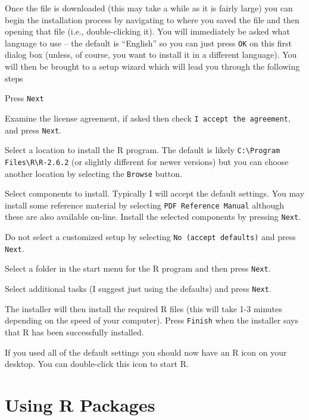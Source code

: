 \documentclass[a4paper]{article}
\begin{document}
Once the file is downloaded (this may take a while as it is fairly large) you can begin the installation process by navigating to where you saved the file and then opening that file (i.e., double-clicking it).  You will immediately be asked what language to use -- the default is ``English'' so you can just press \verb"OK" on this first dialog box (unless, of course, you want to install it in a different language).  You will then be brought to a setup wizard which will lead you through the following steps
\begin{Enumerate}
  \item Press \verb"Next"
  \item Examine the license agreement, if asked then check \verb"I accept the agreement", and press \verb"Next".
  \item Select a location to install the R program.  The default is likely \verb"C:\Program Files\R\R-2.6.2" (or slightly different for newer versions) but you can choose another location by selecting the \verb"Browse" button.
  \item Select components to install.  Typically I will accept the default settings.  You may install some reference material by selecting \verb"PDF Reference Manual" although these are also available on-line.  Install the selected components by pressing \verb"Next".
  \item Do not select a customized setup by selecting \verb"No (accept defaults)" and press \verb"Next".
  \item Select a folder in the start menu for the R program and then press \verb"Next".
  \item Select additional tasks (I suggest just using the defaults) and press \verb"Next".
  \item The installer will then install the required R files (this will take 1-3 minutes depending on the speed of your computer).  Press \verb"Finish" when the installer says that R has been successfully installed.
\end{Enumerate}

If you used all of the default settings you should now have an R icon on your desktop.  You can double-click this icon to start R.


\section{Using R Packages} \label{sect:RPackages}
\end{document}
